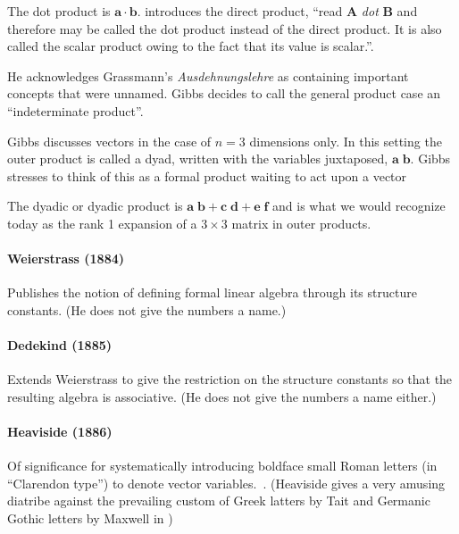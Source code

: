 The dot product is $\mathbf a \cdot \mathbf b$.
\cite[p. 55]{Wilson1901} introduces the direct product, ``read \textbf{A} \textit{dot} \textbf{B} and therefore may be called the dot product instead of the direct product. It is also called the scalar product owing to the fact that its value is scalar.''.

He acknowledges Grassmann's \textit{Ausdehnungslehre} as containing important concepts that were unnamed. Gibbs decides to call the general product case an ``indeterminate product''.

Gibbs discusses vectors in the case of $n=3$ dimensions only. In this setting the outer product is called a dyad, written with the variables juxtaposed, $\mathbf{ a \; b }$.
Gibbs stresses to think of this as a formal product waiting to act upon a vector

The dyadic or dyadic product is $\mathbf{ a \; b } + \mathbf{ c \; d } + \mathbf{ e \; f }$ and is what we would recognize today as the rank 1 expansion of a $3 \times 3$ matrix in outer products.




\paragraph{Weierstrass (1884)~\cite{Weierstrass1884}}

Publishes the notion of defining formal linear algebra through its structure constants. (He does not give the numbers a name.)



\paragraph{Dedekind (1885)~\cite{Dedekind1885}}

Extends Weierstrass to give the restriction on the structure constants so that the resulting algebra is associative. (He does not give the numbers a name either.)



\paragraph{Heaviside (1886)~\cite{Heaviside1886}}

Of significance for systematically introducing boldface small Roman letters (in ``Clarendon type'') to denote vector variables.~\cite{Heaviside1886}. (Heaviside gives a very amusing diatribe against the prevailing custom of Greek latters by Tait and Germanic Gothic letters by Maxwell in \cite[\S 103, pp. 139-142]{Heaviside1894})


